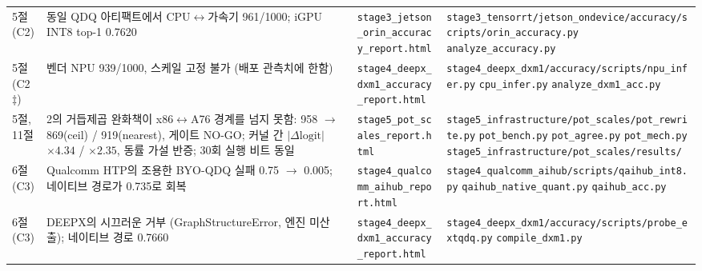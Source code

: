 \documentclass[11pt]{article}
\begin{document}
\begin{longtable}{L{1.2cm} L{3.9cm} L{4.3cm} L{5.0cm}}
\addlinespace[2pt]
5절 (C2) & 동일 QDQ 아티팩트에서 CPU$\leftrightarrow$가속기 961/1000; iGPU INT8 top-1 0.7620 & \texttt{stage3\_\allowbreak jetson\_\allowbreak orin\_\allowbreak accuracy\_\allowbreak report.html} & \texttt{stage3\_\allowbreak tensorrt/\allowbreak jetson\_\allowbreak ondevice/\allowbreak accuracy/\allowbreak scripts/\allowbreak orin\_\allowbreak accuracy.py} \newline \texttt{analyze\_\allowbreak accuracy.py} \\
\addlinespace[2pt]
5절 (C2\,$\ddagger$) & 벤더 NPU 939/1000, 스케일 고정 불가 (배포 관측치에 한함) & \texttt{stage4\_\allowbreak deepx\_\allowbreak dxm1\_\allowbreak accuracy\_\allowbreak report.html} & \texttt{stage4\_\allowbreak deepx\_\allowbreak dxm1/\allowbreak accuracy/\allowbreak scripts/\allowbreak npu\_\allowbreak infer.py} \newline \texttt{cpu\_\allowbreak infer.py} \newline \texttt{analyze\_\allowbreak dxm1\_\allowbreak acc.py} \\
\addlinespace[2pt]
5절, 11절 & 2의 거듭제곱 완화책이 x86$\leftrightarrow$A76 경계를 넘지 못함: 958 $\to$ 869(ceil) / 919(nearest), 게이트 NO-GO; 커널 간 $|\Delta\mathrm{logit}|$ $\times4.34$ / $\times2.35$, 동률 가설 반증; 30회 실행 비트 동일 & \texttt{stage5\_\allowbreak pot\_\allowbreak scales\_\allowbreak report.html} & \texttt{stage5\_\allowbreak infrastructure/\allowbreak pot\_\allowbreak scales/\allowbreak pot\_\allowbreak rewrite.py} \newline \texttt{pot\_\allowbreak bench.py} \newline \texttt{pot\_\allowbreak agree.py} \newline \texttt{pot\_\allowbreak mech.py} \newline \texttt{stage5\_\allowbreak infrastructure/\allowbreak pot\_\allowbreak scales/\allowbreak results/\allowbreak } \\
\addlinespace[2pt]
6절 (C3) & Qualcomm HTP의 조용한 BYO-QDQ 실패 0.75 $\to$ 0.005; 네이티브 경로가 0.735로 회복 & \texttt{stage4\_\allowbreak qualcomm\_\allowbreak aihub\_\allowbreak report.html} & \texttt{stage4\_\allowbreak qualcomm\_\allowbreak aihub/\allowbreak scripts/\allowbreak qaihub\_\allowbreak int8.py} \newline \texttt{qaihub\_\allowbreak native\_\allowbreak quant.py} \newline \texttt{qaihub\_\allowbreak acc.py} \\
\addlinespace[2pt]
6절 (C3) & DEEPX의 시끄러운 거부 (GraphStructureError, 엔진 미산출); 네이티브 경로 0.7660 & \texttt{stage4\_\allowbreak deepx\_\allowbreak dxm1\_\allowbreak accuracy\_\allowbreak report.html} & \texttt{stage4\_\allowbreak deepx\_\allowbreak dxm1/\allowbreak accuracy/\allowbreak scripts/\allowbreak probe\_\allowbreak extqdq.py} \newline \texttt{compile\_\allowbreak dxm1.py} \\

\end{longtable}
\end{document}
